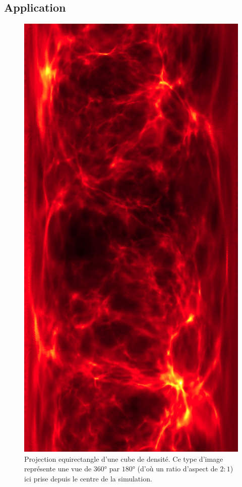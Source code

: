 \subsection{Application}


\begin{figure}
        \includegraphics[height=.95\textheight]{img/04/equi.png} 
        \caption[Projection equirectangle]{Projection equirectangle d'une cube de densité.
        Ce type d'image représente une vue de $360°$ par $180°$ (d'où un ratio d'aspect de $2:1$) ici prise depuis le centre de la simulation.}
 		\label{fig:equirectangle}
\end{figure}

